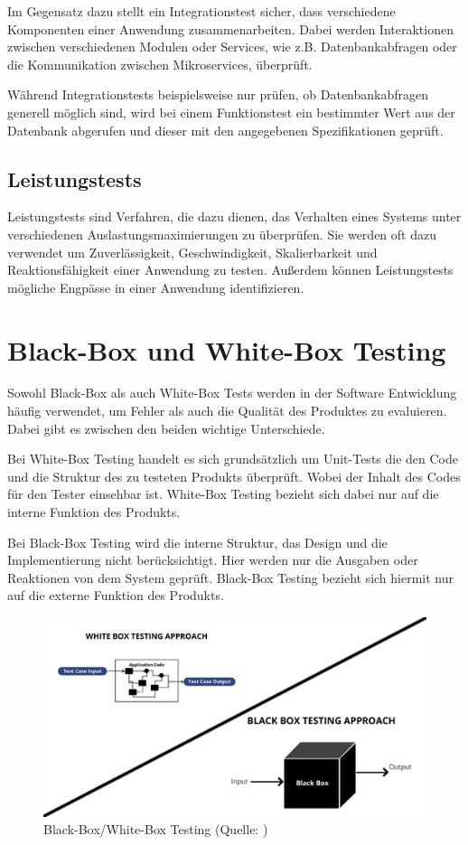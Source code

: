 \documentclass[a4paper, fontsize=11pt, parskip=half, twoside]{scrreprt}
\begin{document}
	Im Gegensatz dazu stellt ein Integrationstest sicher, dass verschiedene Komponenten einer Anwendung zusammenarbeiten.
	Dabei werden Interaktionen zwischen verschiedenen Modulen oder Services, wie z.B. Datenbankabfragen oder die Kommunikation zwischen Mikroservices, überprüft.
	
	Während Integrationstests beispielsweise nur prüfen, ob Datenbankabfragen generell möglich sind, wird bei einem Funktionstest ein bestimmter Wert aus der Datenbank abgerufen und dieser mit den angegebenen Spezifikationen geprüft.
	
	\subsection{Leistungstests}
	Leistungstests sind Verfahren, die dazu dienen, das Verhalten eines Systems unter verschiedenen Auslastungsmaximierungen zu überprüfen. 
	Sie werden oft dazu verwendet um Zuverlässigkeit, Geschwindigkeit, Skalierbarkeit und Reaktionsfähigkeit einer Anwendung zu testen. 
	Außerdem können Leistungstests mögliche Engpässe in einer Anwendung identifizieren.
	
	
	\section{Black-Box und White-Box Testing}
	Sowohl Black-Box als auch White-Box Tests werden in der Software Entwicklung häufig verwendet, um Fehler als auch die Qualität des Produktes zu evaluieren. 
	Dabei gibt es zwischen den beiden wichtige Unterschiede.
	
	Bei White-Box Testing handelt es sich grundsätzlich um Unit-Tests die den Code und die Struktur des zu testeten Produkts überprüft. 
	Wobei der Inhalt des Codes für den Tester einsehbar ist.
	White-Box Testing bezieht sich dabei nur auf die interne Funktion des Produkts.
	
	Bei Black-Box Testing wird die interne Struktur, das Design und die Implementierung nicht berücksichtigt.
	Hier werden nur die Ausgaben oder Reaktionen von dem System geprüft.
	Black-Box Testing bezieht sich hiermit nur auf die externe Funktion des Produkts.
	
	\textcite[Seite 12]{nidhra_black_2012}
	
	\begin{figure}[H]
		\centering
		\includegraphics[scale=0.6]{assets/WhiteBoxBlackBoxTesting.jpg}
		\caption{Black-Box/White-Box Testing (Quelle: \textcite{khandelwal_difference_2019})}
		\label{fig:WhiteBoxBlackBoxTesting}
	\end{figure}
	
\end{document}
